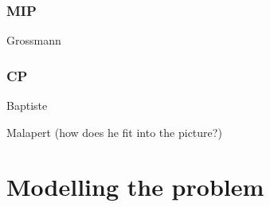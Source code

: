 \documentclass[13pt, letterpaper, twoside]{book}
\begin{document}
\subsection{MIP}
\begin{alist}
    \item{Grossmann}
    \end{alist}
\subsection{CP}
\begin{alist}
    \item{Baptiste}
    \item{Malapert (how does he fit into the picture?)}
\end{alist}
\chapter{Modelling the problem}









\begin{comment}
\chapter{My solution}
\section{MIP formulation improvements}
\section{CP formulation improvements}

\chapter{Discussion}


\pagebreak

\vskip 4em
\end{comment}
\end{document}

